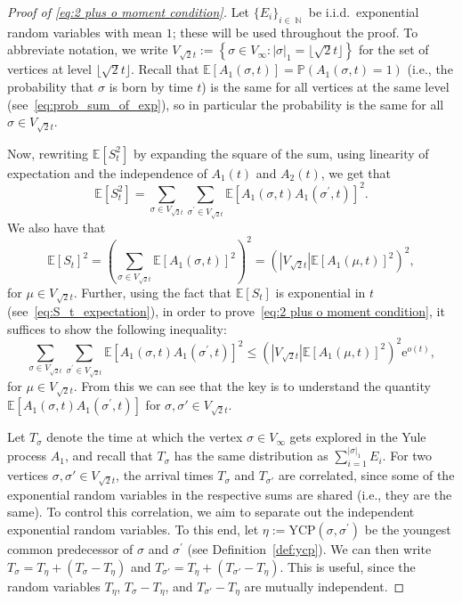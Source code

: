 \documentclass[11pt]{article}
\numberwithin{equation}{section}
\DeclareMathOperator{\N}{\mathbb{N}} %
\newcommand{\p}{\mathbb{P}} %
\newcommand{\E}{\mathbb{E}} %
\newcommand{\ycp}{\mathrm{YCP}} %
\newcommand{\e}{\mathrm e}
\theoremstyle{definition}
\begin{document}
\begin{proof}[Proof of \eqref{eq:2 plus o moment condition}] 
Let $\{E_{i}\}_{i\in \N}$ be i.i.d.\ exponential random variables with mean $1$; these will be used throughout the proof. 
To abbreviate notation, we write $V_{\sqrt{2}t} := \left\{\sigma \in V_\infty : |\sigma|_1 = \lfloor \sqrt{2}t \rfloor \right\}$ for the set of vertices at level $\lfloor \sqrt{2}t \rfloor$. 
Recall that $\E \left[ A_{1}(\sigma, t) \right] = \p \left( A_1(\sigma,t)=1 \right)$ (i.e., the probability that $\sigma$ is born by time $t$) is the same for all vertices at the same level (see~\eqref{eq:prob_sum_of_exp}), so in particular the probability is the same for all~$\sigma \in V_{\sqrt{2}t}$. 

Now, rewriting $\E{[S_t^2]}$ by expanding the square of the sum, using linearity of expectation and the independence of $A_{1}(t)$ and $A_{2}(t)$, we get that 
\begin{equation}
    \E{[S_t^2]} = \sum_{\sigma \in V_{\sqrt{2}t}} \sum_{\sigma^\prime \in V_{\sqrt{2}t}}
\E \left[  A_1(\sigma,t) A_1(\sigma^\prime,t)  \right]^{2}.
\end{equation}
We also have that 
\begin{equation}
    \E{[S_t]}^2 = \left(  \sum_{\sigma \in V_{\sqrt{2}t}} \E[A_1(\sigma, t)]^2\right)^2 =  \left( \left| V_{\sqrt{2}t} \right| \E \left[  A_1(\mu,t)  \right]^2  \right)^2 ,
\end{equation}
for $\mu \in V_{\sqrt{2}t}$. Further, using the fact that $\E[S_{t}]$ is exponential in $t$ (see~\eqref{eq:S_t_expectation}), in order to prove~\eqref{eq:2 plus o moment condition}, it suffices to show the following inequality:
\begin{equation}\label{eq:correlation}
\sum_{\sigma \in V_{\sqrt{2}t}} \sum_{\sigma^\prime \in V_{\sqrt{2}t}}
\E \left[  A_1(\sigma,t) A_1(\sigma^\prime,t)  \right]^{2} 
\leq \left( \left| V_{\sqrt{2}t} \right| \E \left[  A_1(\mu,t)  \right]^2  \right)^2 \e^{o(t)},
\end{equation}
for $\mu \in V_{\sqrt{2}t}$. From this we can see that the key is to understand the quantity 
$\E \left[  A_1(\sigma,t) A_1(\sigma^\prime,t)  \right]$ for $\sigma, \sigma' \in V_{\sqrt{2}t}$.


Let $T_{\sigma}$ denote the time at which the vertex $\sigma \in V_{\infty}$ gets explored in the Yule process $A_{1}$, 
and recall that $T_{\sigma}$ has the same distribution as 
$\sum_{i=1}^{|\sigma|_{1}} E_{i}$. 
For two vertices $\sigma, \sigma' \in V_{\sqrt{2}t}$, 
the arrival times $T_{\sigma}$ and $T_{\sigma'}$ are correlated, 
since some of the exponential random variables in the respective sums are shared (i.e., they are the same). 
To control this correlation, we aim to separate out the independent exponential random variables. 
To this end, let 
$\eta := \ycp(\sigma, \sigma^\prime)$ be the youngest common predecessor of $\sigma$ and $\sigma^\prime$ (see Definition~\ref{def:ycp}). 
We can then write 
$T_{\sigma} = T_{\eta} + (T_{\sigma} - T_{\eta})$ 
and 
$T_{\sigma'} = T_{\eta} + (T_{\sigma'} - T_{\eta})$. 
This is useful, since the random variables 
$T_{\eta}$, $T_{\sigma} - T_{\eta}$, and $T_{\sigma'} - T_{\eta}$ 
are mutually independent. 


\end{proof}
\end{document}
